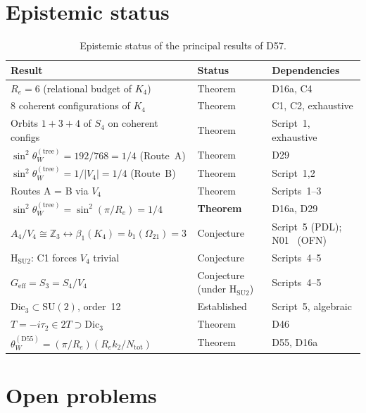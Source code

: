 \documentclass[11pt,a4paper]{article}
\newcommand{\Kfour}{K_4}
\newcommand{\Retot}{R_e}
\newcommand{\sinW}{\sin^2\!\theta_W}
\newcommand{\thetaW}{\theta_W}
\begin{document}
\section{Epistemic status}
\label{sec:epistemic}

\begin{table}[H]
\centering
\caption{Epistemic status of the principal results of D57.}
\label{tab:epistemic}
\small
\begin{tabular}{p{6.5cm}p{2.8cm}p{4.5cm}}
\toprule
Result & Status & Dependencies \\
\midrule
$\Retot = 6$ (relational budget of $\Kfour$) & Theorem & D16a, C4 \\
8 coherent configurations of $\Kfour$ & Theorem & C1, C2, exhaustive \\
Orbits $1+3+4$ of $S_4$ on coherent configs & Theorem & Script~1, exhaustive \\
$\sinW^{(\mathrm{tree})} = 192/768 = 1/4$ (Route~A) & Theorem & D29 \\
$\sinW^{(\mathrm{tree})} = 1/\lvert V_4\rvert = 1/4$ (Route~B) & Theorem & Script~1,2 \\
Routes A = B via $V_4$ & Theorem & Scripts~1--3 \\
$\sinW^{(\mathrm{tree})} = \sin^2(\pi/\Retot) = 1/4$ & \textcolor{proofblue}{\textbf{Theorem}} & D16a, D29 \\
$A_4/V_4 \cong \mathbb{Z}_3 \leftrightarrow \beta_1(\Kfour) = b_1(\Omega_{21}) = 3$ & Conjecture & Script~5 (PDL); N01~\cite{PDL_N01} (OFN) \\
H$_{\mathrm{SU2}}$: C1 forces $V_4$ trivial & \textcolor{conjecturegreen}{Conjecture} & Scripts~4--5 \\
$G_{\mathrm{eff}} = S_3 = S_4/V_4$ & Conjecture (under H$_{\mathrm{SU2}}$) & Scripts~4--5 \\
$\mathrm{Dic}_3 \subset \mathrm{SU}(2)$, order~12 & Established & Script~5, algebraic \\
$T = -i\tau_2 \in 2T \supset \mathrm{Dic}_3$ & Theorem & D46 \\
$\thetaW^{(\mathrm{D55})} = (\pi/\Retot)(\Retot k_2/N_{\mathrm{tot}})$ & Theorem & D55, D16a \\
\bottomrule
\end{tabular}
\end{table}

\section{Open problems}
\label{sec:open}
\end{document}
